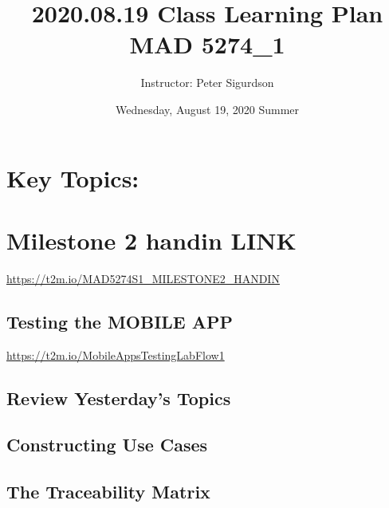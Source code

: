 \documentclass{article}
\title{2020.08.19 Class Learning Plan  MAD 5274_1}
\author{Instructor: Peter Sigurdson }
\date{Wednesday, August 19, 2020 Summer}
\begin{document}
\maketitle

\section * {Key Topics:}
\section{Milestone 2 handin LINK}
\url{https://t2m.io/MAD5274S1_MILESTONE2_HANDIN}

\subsection{Testing the MOBILE APP}
\url{https://t2m.io/MobileAppsTestingLabFlow1}

\subsection{Review Yesterday's Topics}

\subsection{Constructing Use Cases}
\subsection{The Traceability Matrix}
\end{document}
